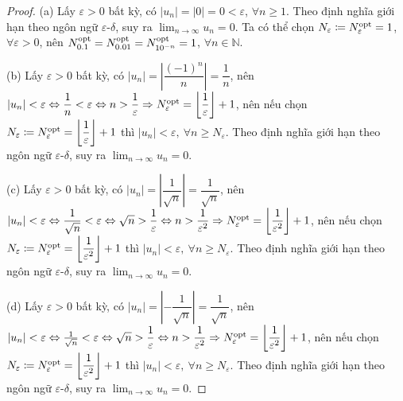 \documentclass{article}
\begin{document}
\begin{proof}
	(a) Lấy $\varepsilon > 0$ bất kỳ, có $|u_n| = |0| = 0 < \varepsilon$, $\forall n\ge1$. Theo định nghĩa giới hạn theo ngôn ngữ $\varepsilon$-$\delta$, suy ra $\lim_{n\to\infty} u_n = 0$. Ta có thể chọn $N_\varepsilon\coloneqq N_\varepsilon^{\rm opt} = 1$, $\forall\varepsilon > 0$, nên $N_{0.1}^{\rm opt} = N_{0.01}^{\rm opt} = N_{10^{-n}}^{\rm opt} = 1$, $\forall n\in\mathbb{N}$.
	
	\item(b) Lấy $\varepsilon > 0$ bất kỳ, có $|u_n| = \left|\dfrac{(-1)^n}{n}\right| = \dfrac{1}{n}$, nên $|u_n| < \varepsilon\Leftrightarrow\dfrac{1}{n} < \varepsilon\Leftrightarrow n > \dfrac{1}{\varepsilon}\Rightarrow N_\varepsilon^{\rm opt} = \left\lfloor\dfrac{1}{\varepsilon}\right\rfloor + 1$, nên nếu chọn $N_\varepsilon\coloneqq N_\varepsilon^{\rm opt} = \left\lfloor\dfrac{1}{\varepsilon}\right\rfloor + 1$ thì $|u_n| < \varepsilon,\ \forall n\ge N_\varepsilon$. Theo định nghĩa giới hạn theo ngôn ngữ $\varepsilon$-$\delta$, suy ra $\lim_{n\to\infty} u_n = 0$.
	
	\item(c) Lấy $\varepsilon > 0$ bất kỳ, có $|u_n| = \left|\dfrac{1}{\sqrt{n}}\right| = \dfrac{1}{\sqrt{n}}$, nên $|u_n| < \varepsilon\Leftrightarrow\dfrac{1}{\sqrt{n}} < \varepsilon\Leftrightarrow\sqrt{n} > \dfrac{1}{\varepsilon}\Leftrightarrow n > \dfrac{1}{\varepsilon^2}\Rightarrow N_\varepsilon^{\rm opt} = \left\lfloor\dfrac{1}{\varepsilon^2}\right\rfloor + 1$, nên nếu chọn $N_\varepsilon\coloneqq N_\varepsilon^{\rm opt} = \left\lfloor\dfrac{1}{\varepsilon^2}\right\rfloor + 1$ thì $|u_n| < \varepsilon,\ \forall n\ge N_\varepsilon$. Theo định nghĩa giới hạn theo ngôn ngữ $\varepsilon$-$\delta$, suy ra $\lim_{n\to\infty} u_n = 0$.
	
	\item(d) Lấy $\varepsilon > 0$ bất kỳ, có $|u_n| = \left|-\dfrac{1}{\sqrt{n}}\right| = \dfrac{1}{\sqrt{n}}$, nên $|u_n| < \varepsilon\Leftrightarrow\frac{1}{\sqrt{n}} < \varepsilon\Leftrightarrow\sqrt{n} > \dfrac{1}{\varepsilon}\Leftrightarrow n > \dfrac{1}{\varepsilon^2}\Rightarrow N_\varepsilon^{\rm opt} = \left\lfloor\dfrac{1}{\varepsilon^2}\right\rfloor + 1$, nên nếu chọn $N_\varepsilon\coloneqq N_\varepsilon^{\rm opt} = \left\lfloor\dfrac{1}{\varepsilon^2}\right\rfloor + 1$ thì $|u_n| < \varepsilon,\ \forall n\ge N_\varepsilon$. Theo định nghĩa giới hạn theo ngôn ngữ $\varepsilon$-$\delta$, suy ra $\lim_{n\to\infty} u_n = 0$.
	

\end{proof}
\end{document}
